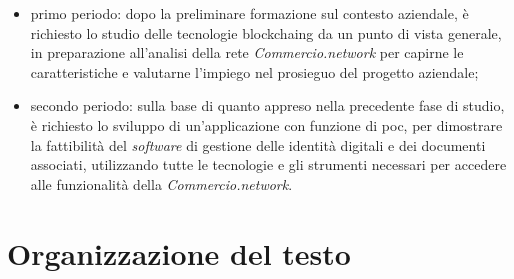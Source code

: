 \begin{itemize}
	\item primo periodo: dopo la preliminare formazione sul contesto aziendale, è richiesto lo studio delle tecnologie \gls{blockchaing} da un punto di vista generale, in preparazione all'analisi della rete \textit{Commercio.network} per capirne le caratteristiche e valutarne l'impiego nel prosieguo del progetto aziendale;
	\item secondo periodo: sulla base di quanto appreso nella precedente fase di studio, è richiesto lo sviluppo di un'applicazione con funzione di \gls{poc}\glsfirstoccur{}, per dimostrare la fattibilità del \textit{software} di gestione delle identità digitali e dei documenti associati, utilizzando tutte le tecnologie e gli strumenti necessari per accedere alle funzionalità della \textit{Commercio.network}. 
 \end{itemize}

\section{Organizzazione del testo}

%    
%    
%    
%    

